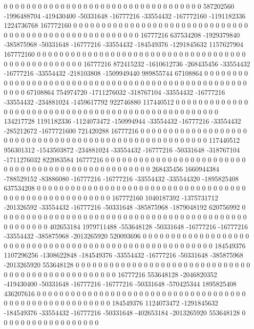 0 0 0 0 0 0 0 0 0 0 0 0 0 0 0 0 0 0 0 0 0 0 0 0 0 0 0 0 0 0 0 0 0 0 0 587202560 -1996488704 -419430400 -50331648 -16777216 -33554432 -167772160 -1191182336 1224736768 167772160 0 0 0 0 0 0 0 0 0 0 0 0 0 0 0 0 0 0 0 0 0 0 0 0 0 0 0 0 0 0 0 0 0 0 0 0 0 0 0 0 0 0 0 0 0 0 0 0 0 0 0 0 0 0 0 16777216 637534208 -1929379840 -385875968 -50331648 -16777216 -33554432 -184549376 -1291845632 1157627904 167772160 0 0 0 0 0 0 0 0 0 0 0 0 0 0 0 0 0
0 0 0 0 0 0 0 0 0 0 0 0 0 0 0 0 0 0 0 0 0 0 0 0 0 0 0 0 0 0 0 0 0 0 16777216 872415232 -1610612736 -268435456 -33554432 -16777216 -33554432 -218103808 -1509949440 989855744 67108864 0 0 0 0 0 0 0 0 0 0 0 0 0 0 0 0 0 0 0 0 0 0 0 0 0 0 0 0 0 0 0 0 0 0 0 0 0 0 0 0 0 0 0 0 0 0 0 0 0 0 0 0 0 0 0 67108864 754974720 -1711276032 -318767104 -33554432 -16777216 -33554432 -234881024 -1459617792 922746880 117440512 0 0 0 0 0 0 0 0 0 0 0 0 0 0 0 0 0
0 0 0 0 0 0 0 0 0 0 0 0 0 0 0 0 0 0 0 0 0 0 0 0 0 0 0 0 0 0 0 0 0 0 134217728 1191182336 -1124073472 -150994944 -33554432 -16777216 -33554432 -285212672 -1677721600 721420288 16777216 0 0 0 0 0 0 0 0 0 0 0 0 0 0 0 0 0 0 0 0 0 0 0 0 0 0 0 0 0 0 0 0 0 0 0 0 0 0 0 0 0 0 0 0 0 0 0 0 0 0 0 0 0 0 0 117440512 956301312 -1543503872 -234881024 -33554432 -16777216 -50331648 -318767104 -1711276032 822083584 16777216 0 0 0 0 0 0 0 0 0 0 0 0 0 0 0 0 0
0 0 0 0 0 0 0 0 0 0 0 0 0 0 0 0 0 0 0 0 0 0 0 0 0 0 0 0 0 0 0 0 0 0 268435456 1660944384 -788529152 -83886080 -16777216 -16777216 -33554432 -335544320 -1895825408 637534208 0 0 0 0 0 0 0 0 0 0 0 0 0 0 0 0 0 0 0 0 0 0 0 0 0 0 0 0 0 0 0 0 0 0 0 0 0 0 0 0 0 0 0 0 0 0 0 0 0 0 0 0 0 0 0 0 167772160 1040187392 -1375731712 -201326592 -33554432 -16777216 -50331648 -385875968 -1879048192 620756992 0 0 0 0 0 0 0 0 0 0 0 0 0 0 0 0 0 0
0 0 0 0 0 0 0 0 0 0 0 0 0 0 0 0 0 0 0 0 0 0 0 0 0 0 0 0 0 0 0 0 0 0 402653184 1979711488 -553648128 -50331648 -16777216 -16777216 -33554432 -385875968 -2013265920 520093696 0 0 0 0 0 0 0 0 0 0 0 0 0 0 0 0 0 0 0 0 0 0 0 0 0 0 0 0 0 0 0 0 0 0 0 0 0 0 0 0 0 0 0 0 0 0 0 0 0 0 0 0 0 0 0 0 184549376 1107296256 -1308622848 -184549376 -33554432 -16777216 -50331648 -385875968 -2013265920 553648128 0 0 0 0 0 0 0 0 0 0 0 0 0 0 0 0 0 0
0 0 0 0 0 0 0 0 0 0 0 0 0 0 0 0 0 0 0 0 0 0 0 0 0 0 0 0 0 0 0 0 0 16777216 553648128 -2046820352 -419430400 -50331648 -16777216 -16777216 -50331648 -570425344 1895825408 436207616 0 0 0 0 0 0 0 0 0 0 0 0 0 0 0 0 0 0 0 0 0 0 0 0 0 0 0 0 0 0 0 0 0 0 0 0 0 0 0 0 0 0 0 0 0 0 0 0 0 0 0 0 0 0 0 0 184549376 1124073472 -1291845632 -184549376 -33554432 -16777216 -50331648 -402653184 -2013265920 553648128 0 0 0 0 0 0 0 0 0 0 0 0 0 0 0 0 0 0
